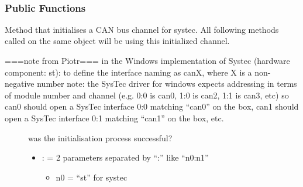 \documentclass[letterpaper,10pt,english]{sphinxmanual}
\begin{document}
\begin{fulllineitems}
\label{\detokenize{vendors/systec:_CPPv49STCanScan}}%
\pysigstartmultiline
{}\label{\detokenize{vendors/systec:classSTCanScan}}%
\pysigstopmultiline~\subsubsection*{Public Functions}

\begin{fulllineitems}
\label{\detokenize{vendors/systec:_CPPv4N9STCanScan9createBusEK6stringK6string}}%
\pysigstartmultiline
{}\label{\detokenize{vendors/systec:classSTCanScan_1aa99f9f23bdfd367a51efc40e228a6f88}}%
\pysigstopmultiline
Method that initialises a CAN bus channel for systec. All following methods called on the same object will be using this initialized channel.


===note from Piotr=== in the Windows implementation of Systec (hardware component: st): to define the interface naming as canX, where X is a non-negative number note: the SysTec driver for windows expects addressing in terms of module number and channel (e.g. 0:0 is can0, 1:0 is can2, 1:1 is can3, etc) so can0 should open a SysTec interface 0:0 matching “can0” on the box, can1 should open a SysTec interface 0:1 matching “can1” on the box, etc. 
\begin{description}
\item[{}] \leavevmode
was the initialisation process successful?

\item[{}] \leavevmode\begin{itemize}
\item {} 
: = 2 parameters separated by “:” like “n0:n1”\begin{itemize}
\item {} 
n0 = “st” for systec


\end{itemize}
\end{itemize}
\end{description}
\end{fulllineitems}
\end{fulllineitems}
\end{document}
